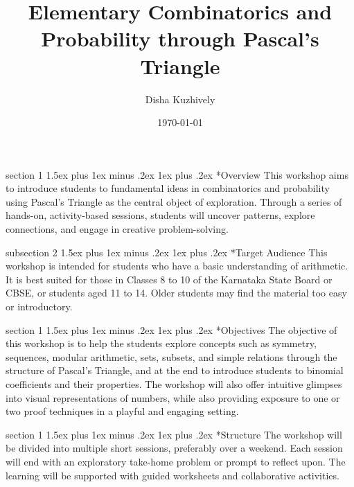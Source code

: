 \documentclass[a4paper,twoside,notitlepage,
11pt,
]{amsart}
\makeatletter
\renewcommand{\section}{\@startsection
  {section}%
  {1}%
  {\z@}%
  {1.5ex plus 1ex minus .2ex}%
  {1ex plus .2ex}%
  {\normalfont\bfseries}}%
\renewcommand{\subsection}{\@startsection
    {subsection}%
    {2}%
    {\z@}%
    {1.5ex plus 1ex minus .2ex}%
    {1ex plus .2ex}%
    {\normalfont\itshape}}%
\makeatother
\begin{document}
\title[Pascal's Triangle]{Elementary Combinatorics and Probability through Pascal's Triangle}
\author{Disha Kuzhively}
\address{\textit{International Centre for Theoretical Sciences - TIFR, Bangalore}}
\date{\today}
\maketitle
\section*{Overview}
This workshop aims to introduce students to fundamental ideas in combinatorics and probability using Pascal's Triangle as the central object of exploration. Through a series of hands-on, activity-based sessions, students will uncover patterns, explore connections, and engage in creative problem-solving.

\subsection*{Target Audience}
This workshop is intended for students who have a basic understanding of arithmetic. It is best suited for those in Classes 
8 to 10 of the Karnataka State Board or CBSE, or students aged 11 to 14. Older students may find the material too easy or introductory.

\section*{Objectives}
The objective of this workshop is to help the students explore concepts such as symmetry, sequences, modular arithmetic, sets, subsets, and simple relations through the structure of Pascal's Triangle, and at the end to introduce students to binomial coefficients and their properties. The workshop will also offer intuitive glimpses into visual representations of numbers, while also providing exposure to one or two proof techniques in a playful and engaging setting.

\section*{Structure}
The workshop will be divided into multiple short sessions, preferably over a weekend. Each session will end with an exploratory take-home problem or prompt to reflect upon. The learning will be supported with guided worksheets and collaborative activities.
\end{document}
